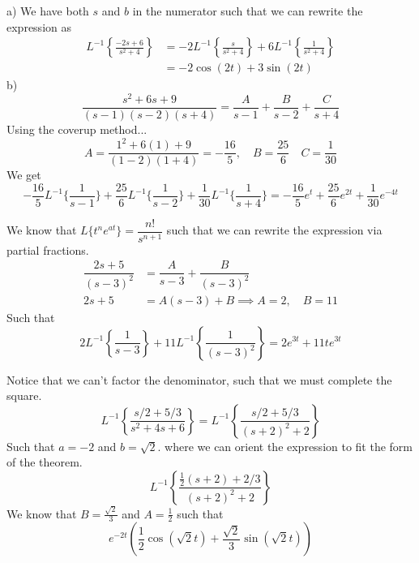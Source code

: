 \documentclass{article}
\begin{document}

\sol a) We have both $s$ and $b$ in the numerator such that we can rewrite the expression as
\begin{align*}
  L^{-1}\left\{\frac{-2s+6}{s^2+4}\right\} &= -2L^{-1}\left\{\frac{s}{s^2+4}\right\} + 6L^{-1}\left\{\frac{1}{s^2+4}\right\} \\
  &=  \boxed{-2\cos(2t) + 3\sin(2t)}
\end{align*}
\double
b)
  $$
  \dfrac{s^2+6s+9}{(s-1)(s-2)(s+4)} = \frac{A}{s-1} + \frac{B}{s-2} + \frac{C}{s+4} 
  $$
Using the coverup method...
$$
  A = \frac{1^2+6(1)+9}{(1-2)(1+4)} = -\frac{16}{5}, \quad B = \frac{25}{6} \quad C = \frac{1}{30}
$$
We get
$$ -\frac{16}{5} L^{-1}\{ \frac{1}{s-1} \} + \frac{25}{6} L^{-1}\{ \frac{1}{s-2} \} + \frac{1}{30} L^{-1}\{ \frac{1}{s+4} \} = \boxed{-\frac{16}{5} e^t + \frac{25}{6} e^{2t} + \frac{1}{30} e^{-4t}} $$

\sol We know that $L\{t^n e^{at}\} = \dfrac{n!}{s^{n+1}}$ such that we can rewrite the expression via partial fractions.
\begin{align*}
  \dfrac{2s+5}{(s-3)^2} &= \dfrac{A}{s-3} + \dfrac{B}{(s-3)^2} \\
  2s+5 &= A(s-3) + B
  \implies A = 2, \quad B = 11
\end{align*}
Such that
$$ 2L^{-1}\left\{\frac{1}{s-3}\right\} + 11L^{-1}\left\{\frac{1}{(s-3)^2}\right\} = \boxed{2e^{3t} + 11te^{3t}} $$


\sol Notice that we can't factor the denominator, such that we must complete the square.
$$ L^{-1}\left\{\frac{s / 2+5 / 3}{s^2+4 s+6}\right\} = L^{-1}\left\{\frac{s/2 + 5/3}{(s+2)^2 + 2}\right\} $$
Such that $a = -2$ and $b = \sqrt{2}$. where we can orient the expression to fit the form of the theorem.
$$ L^{-1}\left\{\frac{\frac{1}{2}(s+2) + 2/3}{(s+2)^2 + 2}\right\}$$
We know that $B = \frac{\sqrt{2}}{3}$ and $A = \frac{1}{2}$ such that
$$ \boxed{e^{-2t}\left(\frac{1}{2} \cos (\sqrt{2}t) + \frac{\sqrt{2}}{3} \sin (\sqrt{2}t)\right)} $$
\end{document}
